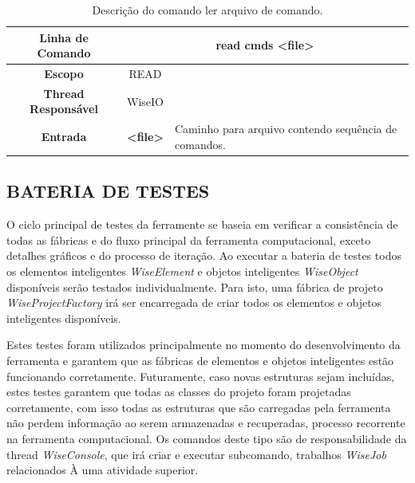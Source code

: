 \documentclass[a4paper,12pt]{monografia}
\theoremstyle{plain}
\theoremstyle{definition}
\theoremstyle{remark}
\begin{document}
\begin{center}
	\begin{table}[!htbp]
		\begin{tabular}{|c|c|m{}|}
			\hline
			\textbf{Linha de Comando} & \multicolumn{2}{c|}{read cmds <file>} \\
			\hline
			\textbf{Escopo} & \multicolumn{1}{c|}{READ} \\
			\hline
			\textbf{Thread Responsável} & \multicolumn{1}{c|}{WiseIO} \\
			\hline
			\textbf{Entrada} & \textbf{<file>} & Caminho para arquivo contendo sequência de comandos. \\
			\hline
		\end{tabular}
	\caption{Descrição do comando ler arquivo de comando.}
	\label{tab:read}
	\end{table}
\end{center}

\subsection{BATERIA DE TESTES}\label{sec:test}

O ciclo principal de testes da ferramente se baseia em verificar a consistência de todas as fábricas e do fluxo principal da ferramenta computacional, exceto detalhes gráficos e do processo de iteração. Ao executar a bateria de testes todos os elementos inteligentes \textit{WiseElement} e objetos inteligentes \textit{WiseObject} disponíveis serão testados individualmente. Para isto, uma fábrica de projeto \textit{WiseProjectFactory} irá ser encarregada de criar todos os elementos e objetos inteligentes disponíveis.

Estes testes foram utilizados principalmente no momento do desenvolvimento da ferramenta e garantem que as fábricas de elementos e objetos inteligentes estão funcionando corretamente. Futuramente, caso novas estruturas sejam incluídas, estes testes garantem que todas as classes do projeto foram projetadas corretamente, com isso todas as estruturas que são carregadas pela ferramenta não perdem informação ao serem armazenadas e recuperadas, processo recorrente na ferramenta computacional. Os comandos deste tipo são de responsabilidade da thread \textit{WiseConsole}, que irá criar e executar subcomando, trabalhos \textit{WiseJob} relacionados À uma atividade superior.
\end{document}
